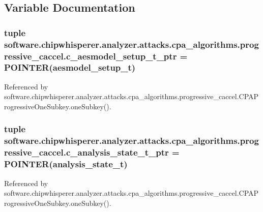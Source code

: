 \subsection{Variable Documentation}
\hypertarget{namespacesoftware_1_1chipwhisperer_1_1analyzer_1_1attacks_1_1cpa__algorithms_1_1progressive__caccel_a5ac392b22526a6a9379e8b8be3d11347}{}
\subsubsection[{c\+\_\+aesmodel\+\_\+setup\+\_\+t\+\_\+ptr}]{\setlength{\rightskip}{0pt plus 5cm}tuple software.\+chipwhisperer.\+analyzer.\+attacks.\+cpa\+\_\+algorithms.\+progressive\+\_\+caccel.\+c\+\_\+aesmodel\+\_\+setup\+\_\+t\+\_\+ptr = P\+O\+I\+N\+T\+E\+R({\bf aesmodel\+\_\+setup\+\_\+t})}\label{namespacesoftware_1_1chipwhisperer_1_1analyzer_1_1attacks_1_1cpa__algorithms_1_1progressive__caccel_a5ac392b22526a6a9379e8b8be3d11347}


Referenced by software.\+chipwhisperer.\+analyzer.\+attacks.\+cpa\+\_\+algorithms.\+progressive\+\_\+caccel.\+C\+P\+A\+Progressive\+One\+Subkey.\+one\+Subkey().

\hypertarget{namespacesoftware_1_1chipwhisperer_1_1analyzer_1_1attacks_1_1cpa__algorithms_1_1progressive__caccel_aabd08257306b5406199bb1f33e87122e}{}
\subsubsection[{c\+\_\+analysis\+\_\+state\+\_\+t\+\_\+ptr}]{\setlength{\rightskip}{0pt plus 5cm}tuple software.\+chipwhisperer.\+analyzer.\+attacks.\+cpa\+\_\+algorithms.\+progressive\+\_\+caccel.\+c\+\_\+analysis\+\_\+state\+\_\+t\+\_\+ptr = P\+O\+I\+N\+T\+E\+R({\bf analysis\+\_\+state\+\_\+t})}\label{namespacesoftware_1_1chipwhisperer_1_1analyzer_1_1attacks_1_1cpa__algorithms_1_1progressive__caccel_aabd08257306b5406199bb1f33e87122e}


Referenced by software.\+chipwhisperer.\+analyzer.\+attacks.\+cpa\+\_\+algorithms.\+progressive\+\_\+caccel.\+C\+P\+A\+Progressive\+One\+Subkey.\+one\+Subkey().

